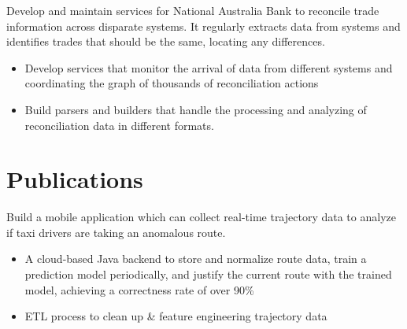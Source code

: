\documentclass{resume}
\begin{document}
\begin{flushleft}
Develop and maintain services for National Australia Bank to reconcile trade information across disparate systems. It regularly extracts data from systems and identifies trades that should be the same, locating any differences.
\begin{itemize}
  \item Develop services that monitor the arrival of data from different systems and coordinating the graph of thousands of reconciliation actions
  \item Build parsers and builders that handle the processing and analyzing of reconciliation data in different formats.
\end{itemize}
\end{flushleft}

\section{Publications}
\begin{flushleft}
Build a mobile application which can collect real-time trajectory data to analyze if taxi drivers are taking an anomalous route.
\begin{itemize}
    \item A cloud-based Java backend to store and normalize route data, train a prediction model periodically, \linebreak and justify the current route with the trained model, achieving a correctness rate of over 90\%
    \item ETL process to clean up \& feature engineering trajectory data
\end{itemize}
\end{flushleft}
\end{document}
